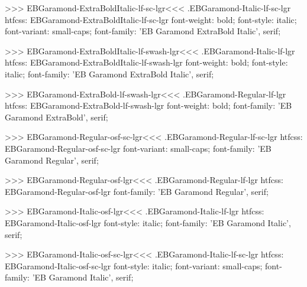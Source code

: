 >>>
\<EBGaramond-ExtraBoldItalic-lf-sc-lgr\><<<
.EBGaramond-Italic-lf-sc-lgr
htfcss:  EBGaramond-ExtraBoldItalic-lf-sc-lgr  font-weight: bold; font-style: italic; font-variant: small-caps; font-family: 'EB Garamond ExtraBold Italic', serif;

>>>
\<EBGaramond-ExtraBoldItalic-lf-swash-lgr\><<<
.EBGaramond-Italic-lf-lgr
htfcss:  EBGaramond-ExtraBoldItalic-lf-swash-lgr  font-weight: bold; font-style: italic; font-family: 'EB Garamond ExtraBold Italic', serif;

>>>
\<EBGaramond-ExtraBold-lf-swash-lgr\><<<
.EBGaramond-Regular-lf-lgr
htfcss:  EBGaramond-ExtraBold-lf-swash-lgr  font-weight: bold; font-family: 'EB Garamond ExtraBold', serif;

>>>
\<EBGaramond-Regular-osf-sc-lgr\><<<
.EBGaramond-Regular-lf-sc-lgr
htfcss:  EBGaramond-Regular-osf-sc-lgr  font-variant: small-caps; font-family: 'EB Garamond Regular', serif;

>>>
\<EBGaramond-Regular-osf-lgr\><<<
.EBGaramond-Regular-lf-lgr
htfcss:  EBGaramond-Regular-osf-lgr  font-family: 'EB Garamond Regular', serif;

>>>
\<EBGaramond-Italic-osf-lgr\><<<
.EBGaramond-Italic-lf-lgr
htfcss:  EBGaramond-Italic-osf-lgr  font-style: italic; font-family: 'EB Garamond Italic', serif;

>>>
\<EBGaramond-Italic-osf-sc-lgr\><<<
.EBGaramond-Italic-lf-sc-lgr
htfcss:  EBGaramond-Italic-osf-sc-lgr  font-style: italic; font-variant: small-caps; font-family: 'EB Garamond Italic', serif;

